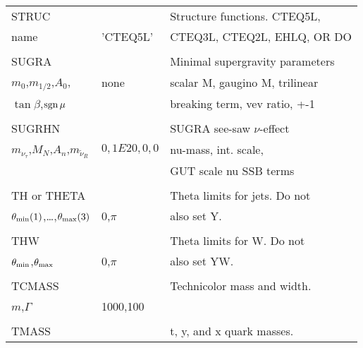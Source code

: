 \newpage
\begin{center}
\begin{tabular}{lll}
\hline\hline
STRUC                  &                   & Structure functions. CTEQ5L,   \\
name                   & 'CTEQ5L'          & CTEQ3L, CTEQ2L, EHLQ, OR DO    \\
                       &                   &                                \\
SUGRA                  &                   & Minimal supergravity parameters\\
$m_0$,$m_{1/2}$,$A_0$, & none              & scalar M, gaugino M, trilinear \\
$\tan\beta$,$\mathop{\rm sgn}\mu$  &                   & breaking term, vev ratio, +-1  \\
                       &                   &                                \\
SUGRHN                 &                   & SUGRA see-saw $\nu$-effect     \\
$m_{\nu_\tau}$,$M_N$,$A_n$,$m_{\tilde\nu_R}$ & $0,1E20,0,0$ & nu-mass, 
int. scale, \\
                       &                   & GUT scale nu SSB terms         \\
                       &                   &                                \\
TH or THETA            &                   & Theta limits for jets. Do not  \\
$\theta_{\rm min}(1)$,\dots,$\theta_{\rm max}(3)$ & 0,$\pi$ & also set Y.   \\
                       &                   &                                \\
THW                    &                   & Theta limits for W. Do not     \\
$\theta_{\rm min}$,$\theta_{\rm max}$ & 0,$\pi$ & also set YW.              \\
                       &                   &                                \\
TCMASS                 &                   & Technicolor mass and width.    \\
$m$,$\Gamma$           & 1000,100          &                                \\
                       &                   &                                \\
TMASS                  &                   & t, y, and x quark masses.      \\

\end{tabular}
\end{center}
